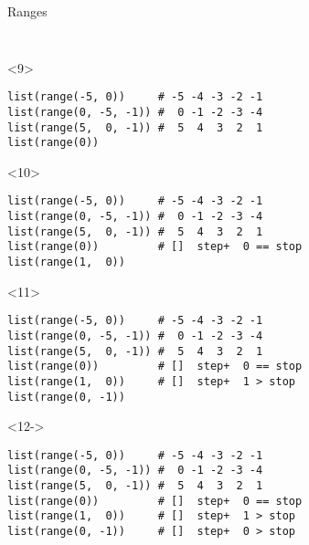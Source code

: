 \begin{frame}[fragile]{Ranges}
\begin{center}
\begin{columns}[onlytextwidth]
\begin{column}{\textwidth}
\begin{onlyenv}
\begin{lstlisting}[style=python,morekeywords={for, in, range, list}]
 \end{lstlisting}
      \end{onlyenv}

      \begin{onlyenv}<9>
        \begin{lstlisting}[style=python,morekeywords={for, in, range, list}]
list(range(-5, 0))     # -5 -4 -3 -2 -1
list(range(0, -5, -1)) #  0 -1 -2 -3 -4
list(range(5,  0, -1)) #  5  4  3  2  1
list(range(0))

 \end{lstlisting}
      \end{onlyenv}

      \begin{onlyenv}<10>
        \begin{lstlisting}[style=python,morekeywords={for, in, range, list}]
list(range(-5, 0))     # -5 -4 -3 -2 -1
list(range(0, -5, -1)) #  0 -1 -2 -3 -4
list(range(5,  0, -1)) #  5  4  3  2  1
list(range(0))         # []  step+  0 == stop
list(range(1,  0))
 \end{lstlisting}
      \end{onlyenv}

      \begin{onlyenv}<11>
        \begin{lstlisting}[style=python,morekeywords={for, in, range, list}]
list(range(-5, 0))     # -5 -4 -3 -2 -1
list(range(0, -5, -1)) #  0 -1 -2 -3 -4
list(range(5,  0, -1)) #  5  4  3  2  1
list(range(0))         # []  step+  0 == stop
list(range(1,  0))     # []  step+  1 > stop
list(range(0, -1)) \end{lstlisting}
      \end{onlyenv}

      \begin{onlyenv}<12->
        \begin{lstlisting}[style=python,morekeywords={for, in, range, list}]
list(range(-5, 0))     # -5 -4 -3 -2 -1
list(range(0, -5, -1)) #  0 -1 -2 -3 -4
list(range(5,  0, -1)) #  5  4  3  2  1
list(range(0))         # []  step+  0 == stop
list(range(1,  0))     # []  step+  1 > stop
list(range(0, -1))     # []  step+  0 > stop \end{lstlisting}
      \end{onlyenv}

    \end{column}
  \end{columns}

  \end{center}

\end{frame}



